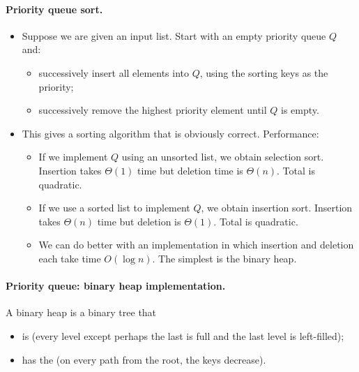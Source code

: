 \paragraph{Priority queue sort.}
\begin{itemize}
\item Suppose we are given an input list. Start with an empty priority queue $Q$
 and:
\begin{itemize}
\item successively insert all elements into $Q$, using the sorting keys as the 
priority;
\item successively remove the highest priority element until $Q$ is empty. 
\end{itemize}
\item This gives a sorting algorithm that is obviously correct. Performance:
\begin{itemize}
\item If we implement $Q$ using an unsorted list, we obtain selection sort. 
Insertion takes $\Theta(1)$ time but deletion time is $\Theta(n)$. Total is quadratic.
\item If we use a sorted list to implement $Q$, we obtain insertion sort. 
Insertion takes $\Theta(n)$ time but deletion is $\Theta(1)$. Total is quadratic.
\item We can do better with an implementation in which insertion and deletion 
each take time $O(\log n)$. The simplest is the {binary heap}.
\end{itemize}
\end{itemize}

\paragraph{Priority queue: binary heap implementation.}
\begin{Definition}
A {binary heap} is a binary tree that 
\begin{itemize}
\item is  (every level except perhaps the last is full and 
the last level is left-filled);
\item has the  (on every path from the root, the keys decrease). 
\end{itemize}
\end{Definition}

